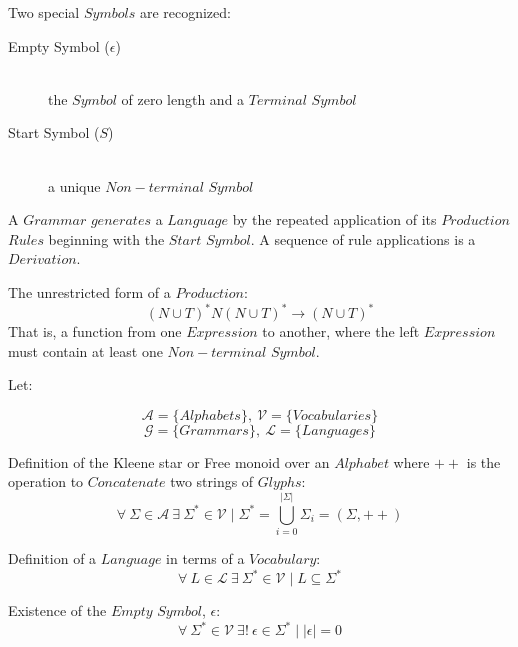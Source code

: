 \documentclass{article}
\begin{document}
Two special $Symbols$ are recognized:

    \begin{description}

    \item[Empty Symbol ($\epsilon$)] \hfill \\
    the $Symbol$ of zero length and a $Terminal$ $Symbol$

    \item[Start Symbol ($S$)] \hfill \\
    a unique $Non-terminal$ $Symbol$

    \end{description}

A $Grammar$ $generates$ a $Language$ by the repeated application
of its $Production$ $Rules$ beginning with the $Start$ $Symbol$. A
sequence of rule applications is a $Derivation$.

The unrestricted form of a $Production$:
\[
    (N \cup T)^*N(N \cup T)^* \rightarrow (N \cup T)^*
\]
That is, a function from one $Expression$ to another, where the left
$Expression$ must contain at least one $Non-terminal$ $Symbol$.

Let:

\[
    \mathcal{A} = \{ Alphabets \},\: \mathcal{V} = \{ Vocabularies \}
\] \[
    \mathcal{G} = \{ Grammars \},\: \mathcal{L} = \{ Languages \}
\]

    \begin{description}

    \item Definition of the Kleene star or Free monoid over an
      $Alphabet$ where $++$ is the operation to $Concatenate$ two
      strings of $Glyphs$:
    \[
        \forall \: \Sigma \in \mathcal{A} \:
        \exists \: \Sigma^* \in \mathcal{V}
        \mid \Sigma^* = \bigcup_{i=0}^{|\Sigma|} \Sigma_i
        = (\Sigma,++)
    \]

    \item Definition of a $Language$ in terms of a $Vocabulary$:
    \[
        \forall \: L \in \mathcal{L} \:
        \exists \: \Sigma^* \in \mathcal{V}
        \mid L \subseteq \Sigma^*
    \]

    \item Existence of the $Empty$ $Symbol$, $\epsilon$:
    \[
        \forall \: \Sigma^* \in \mathcal{V} \:
        \exists ! \: \epsilon \in \Sigma^*
        \mid |\epsilon|=0
    \]

    \end{description}
\end{document}

